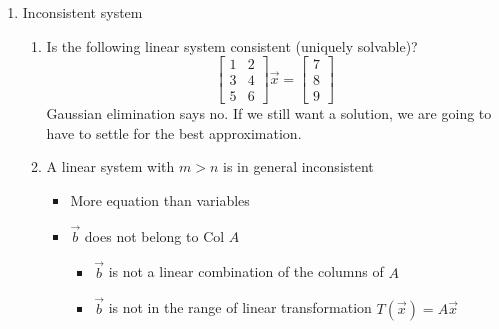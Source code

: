 \documentclass{article}
\theoremstyle{remark}
\begin{document}
\begin{enumerate}
\item Inconsistent system
\begin{enumerate}
\item Is the following linear system consistent (uniquely solvable)? 
$$
\begin{bmatrix}
1 & 2\\
3 & 4\\
5 & 6
\end{bmatrix}\vec x = 
\begin{bmatrix}
7\\8\\9
\end{bmatrix}
$$
Gaussian elimination says no. If we still want a solution, we are going to have to settle for the best approximation.

\item A linear system with $m>n$ is in general inconsistent
\begin{itemize}
\item More equation than variables
\item $\vec b$ does not belong to Col $A$
\begin{itemize}
\item $\vec b$ is not a linear combination of the columns of $A$
\item $\vec b$ is not in the range of linear transformation $T(\vec x) = A\vec x$
\end{itemize}
\end{itemize}


\end{enumerate}
\end{enumerate}
\end{document}
